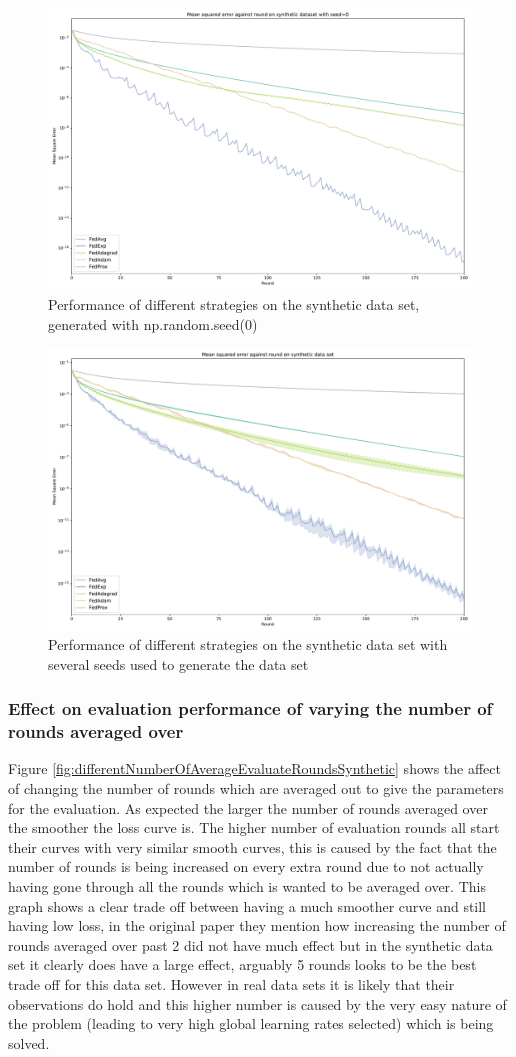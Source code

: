 \documentclass{article}
\begin{document}
\begin{figure}
    \centerline{\includegraphics[width=.6\linewidth]{figs/syntheticSeed0_200Rounds.pdf}}
    \caption{Performance of different strategies on the synthetic data set, generated with np.random.seed(0)}
    \label{fig:200RoundsSeed0}
\end{figure}

\begin{figure}
    \centerline{\includegraphics[width=.6\linewidth]{figs/synthetic_200Rounds_ManySeeds.pdf}}
    \caption{Performance of different strategies on the synthetic data set with several seeds used to generate the data set}
    \label{fig:200RoundsSeed42}
\end{figure}


\subsubsection{Effect on evaluation performance of varying the number of rounds averaged over}

Figure \ref{fig:differentNumberOfAverageEvaluateRoundsSynthetic} shows the affect of changing the number of rounds which are averaged out to give the parameters for the evaluation.  As expected the larger the number of rounds averaged over the smoother the loss curve is.  The higher number of evaluation rounds all start their curves with very similar smooth curves, this is caused by the fact that the number of rounds is being increased on every extra round due to not actually having gone through all the rounds which is wanted to be averaged over.  This graph shows a clear trade off between having a much smoother curve and still having low loss, in the original paper they mention how increasing the number of rounds averaged over past 2 did not have much effect but in the synthetic data set it clearly does have a large effect, arguably 5 rounds looks to be the best trade off for this data set.  However in real data sets it is likely that their observations do hold and this higher number is caused by the very easy nature of the problem (leading to very high global learning rates selected) which is being solved. 
\end{document}
